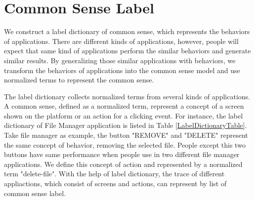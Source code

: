\clearpage

\section{Common Sense Label}

We construct a label dictionary of common sense, which represents the behaviors of applications.
There are different kinds of applications, however,
people will expect that same kind of applications perform the similar behaviors and generate similar results.
By generalizing those similar applications with behaviors,
we transform the behaviors of applications into the common sense model and use normalized terms to represent the common sense.

The label dictionary collects normalized terms from several kinds of applications.
A common sense, defined as a normalized term, represent a concept of a screen shown on the platform or an action for a clicking event.
For instance, the label dictionary of File Manager application is listed in Table \ref{LabelDictionaryTable}.
Take file manager as example, the button "REMOVE" and "DELETE" represent the same concept of behavior, removing the selected file.
People except this two buttons have same performance when people use in two different file manager applications.
We define this concept of action and represented by a normalized term "delete-file".
With the help of label dictionary,
the trace of different appliactions, which consist of screens and actions, 
can represent by list of common sense label.


